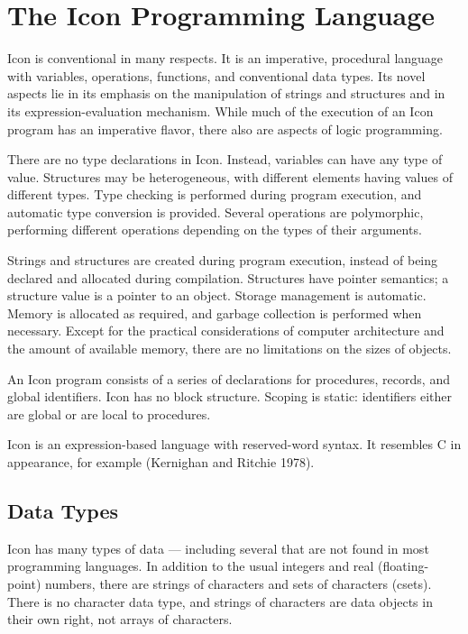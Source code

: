 \section{The Icon Programming Language}

Icon is conventional in many respects. It is an imperative, procedural
language with variables, operations, functions, and conventional data
types. Its novel aspects lie in its emphasis on the manipulation of
strings and structures and in its expression-evaluation
mechanism. While much of the execution of an Icon program has an
imperative flavor, there also are aspects of logic programming.

There are no type declarations in Icon. Instead, variables can have
any type of value. Structures may be heterogeneous, with different
elements having values of different types. Type checking is performed
during program execution, and automatic type conversion is
provided. Several operations are polymorphic, performing different
operations depending on the types of their arguments.

Strings and structures are created during program execution, instead
of being declared and allocated during compilation.  Structures have
pointer semantics; a structure value is a pointer to an object.
Storage management is automatic. Memory is allocated as required, and
garbage collection is performed when necessary. Except for the
practical considerations of computer architecture and the amount of
available memory, there are no limitations on the sizes of objects.

An Icon program consists of a series of declarations for procedures,
records, and global identifiers. Icon has no block structure. Scoping
is static: identifiers either are global or are local to procedures.

Icon is an expression-based language with reserved-word syntax. It
resembles C in appearance, for example (Kernighan and Ritchie 1978).

\subsection{Data Types}

Icon has many types of data --- including several that are not found in
most programming languages. In addition to the usual integers and real
(floating-point) numbers, there are strings of characters and sets of
characters (csets). There is no character data type, and strings of
characters are data objects in their own right, not arrays of
characters.

